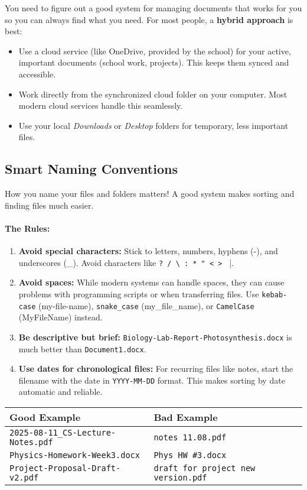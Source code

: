 \documentclass[11pt,a4paper]{report}
\newcommand{\bfb}[1]{{\bf \color{blue} #1}}
\begin{document}
You need to figure out a good system for managing documents that works for you so you can always find what you need.
For most people, a \textbf{hybrid approach} is best:
\begin{itemize}
    \item Use a cloud service (like OneDrive, provided by the school) for your active, important documents (school work, projects). This keeps them synced and accessible.
    \item Work directly from the synchronized cloud folder on your computer.
        Most modern cloud services handle this seamlessly.
    \item Use your local \emph{Downloads} or \emph{Desktop} folders for temporary, less important files.
\end{itemize}


\subsection{Smart Naming Conventions}
How you name your files and folders matters! A good system makes sorting and finding files much easier.

\paragraph{The Rules:}
\begin{enumerate}
    \item \textbf{Avoid special characters:} Stick to letters, numbers, hyphens (-), and underscores (\_). Avoid characters like \verb|? / \ : * " < > | |.
    \item \textbf{Avoid spaces:} While modern systems can handle spaces, they can cause problems with programming scripts or when transferring files.
        Use \texttt{kebab-case} (my-file-name), \texttt{snake\_case} (my\_file\_name), or \texttt{CamelCase} (MyFileName) instead.
    \item \textbf{Be descriptive but brief:} \texttt{Biology-Lab-Report-Photosynthesis.docx} is much better than \texttt{Document1.docx}.
    \item \textbf{Use dates for chronological files:} For recurring files like notes, start the filename with the date in \texttt{YYYY-MM-DD} format. This makes sorting by date automatic and reliable.
        
\end{enumerate}

\begin{center}
\begin{tabular}{|l|l|}
\hline
\bfb{Good Example} & \bfb{Bad Example} \\
\hline
\texttt{2025-08-11\_CS-Lecture-Notes.pdf} & \texttt{notes 11.08.pdf} \\
\texttt{Physics-Homework-Week3.docx} & \texttt{Phys HW \#3.docx} \\
\texttt{Project-Proposal-Draft-v2.pdf} & \texttt{draft for project new version.pdf} \\
\hline
\end{tabular}
\end{center}
\end{document}
